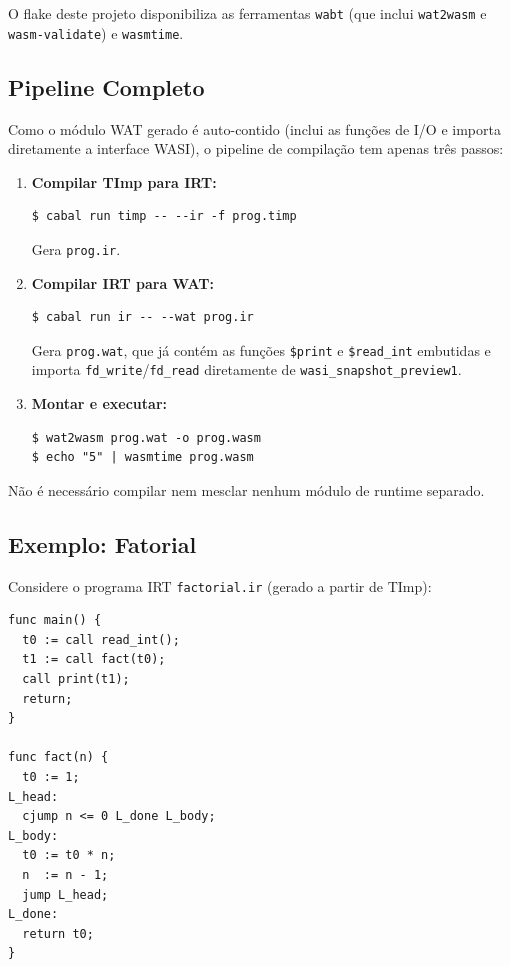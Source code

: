 O flake deste projeto disponibiliza as ferramentas \texttt{wabt} (que inclui
\texttt{wat2wasm} e \texttt{wasm-validate}) e \texttt{wasmtime}.

\subsection{Pipeline Completo}

Como o módulo WAT gerado é auto-contido (inclui as funções de I/O e importa
diretamente a interface WASI), o pipeline de compilação tem apenas três passos:

\begin{enumerate}
  \item \textbf{Compilar TImp para IRT:}
\begin{verbatim}
$ cabal run timp -- --ir -f prog.timp
\end{verbatim}
    Gera \texttt{prog.ir}.

  \item \textbf{Compilar IRT para WAT:}
\begin{verbatim}
$ cabal run ir -- --wat prog.ir
\end{verbatim}
    Gera \texttt{prog.wat}, que já contém as funções \texttt{\$print} e
    \texttt{\$read\_int} embutidas e importa \texttt{fd\_write}/\texttt{fd\_read}
    diretamente de \texttt{wasi\_snapshot\_preview1}.

  \item \textbf{Montar e executar:}
\begin{verbatim}
$ wat2wasm prog.wat -o prog.wasm
$ echo "5" | wasmtime prog.wasm
\end{verbatim}
\end{enumerate}

Não é necessário compilar nem mesclar nenhum módulo de runtime separado.

\subsection{Exemplo: Fatorial}\label{subsec:wat-factorial}

Considere o programa IRT \texttt{factorial.ir} (gerado a partir de TImp):

\begin{verbatim}
func main() {
  t0 := call read_int();
  t1 := call fact(t0);
  call print(t1);
  return;
}

func fact(n) {
  t0 := 1;
L_head:
  cjump n <= 0 L_done L_body;
L_body:
  t0 := t0 * n;
  n  := n - 1;
  jump L_head;
L_done:
  return t0;
}
\end{verbatim}

